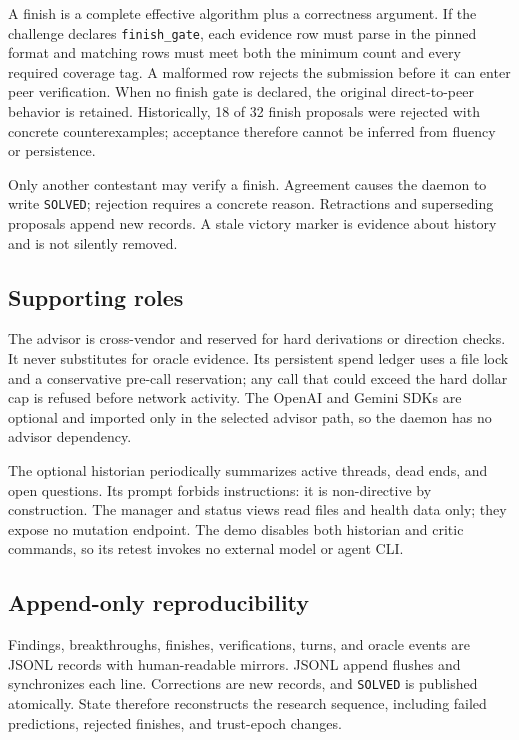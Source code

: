 \documentclass[11pt]{article}
\newcommand{\code}[1]{\texttt{#1}}
\begin{document}
A finish is a complete effective algorithm plus a correctness argument.  If
the challenge declares \code{finish\_gate}, each evidence row must parse in
the pinned format and matching rows must meet both the minimum count and every
required coverage tag.  A malformed row rejects the submission before it can
enter peer verification.  When no finish gate is declared, the original
direct-to-peer behavior is retained.  Historically, 18 of 32 finish
proposals were rejected with concrete counterexamples; acceptance therefore
cannot be inferred from fluency or persistence.

Only another contestant may verify a finish.  Agreement causes the daemon to
write \code{SOLVED}; rejection requires a concrete reason.  Retractions and
superseding proposals append new records.  A stale victory marker is evidence
about history and is not silently removed.

\clearpage

\subsection{Supporting roles}

The advisor is cross-vendor and reserved for hard derivations or direction
checks.  It never substitutes for oracle evidence.  Its persistent spend
ledger uses a file lock and a conservative pre-call reservation; any call
that could exceed the hard dollar cap is refused before network activity.
The OpenAI and Gemini SDKs are optional and imported only in the selected
advisor path, so the daemon has no advisor dependency.

The optional historian periodically summarizes active threads, dead ends,
and open questions.  Its prompt forbids instructions: it is non-directive by
construction.  The manager and status views read files and health data only;
they expose no mutation endpoint.  The demo disables both historian and critic
commands, so its retest invokes no external model or agent CLI.

\subsection{Append-only reproducibility}

Findings, breakthroughs, finishes, verifications, turns, and oracle events
are JSONL records with human-readable mirrors.  JSONL append flushes and
synchronizes each line.  Corrections are new records, and \code{SOLVED} is
published atomically.  State therefore reconstructs the research sequence,
including failed predictions, rejected finishes, and trust-epoch changes.
\end{document}

